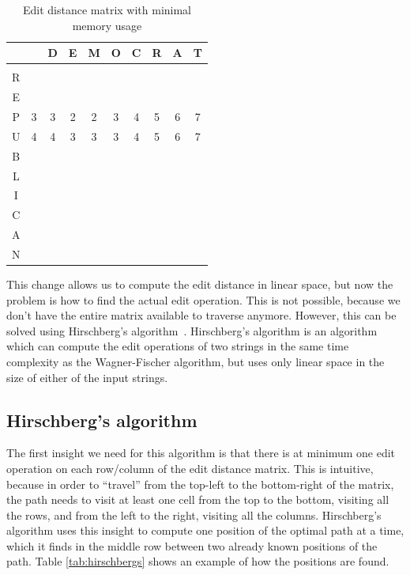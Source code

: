 \begin{table}[t]
	\begin{center}
		\begin{tabular}[c]{c|c|c|c|c|c|c|c|c|c|}
			  &   & D & E & M & O & C & R & A & T \\\hline
			  &   &   &   &   &   &   &   &   &   \\\hline
			R &   &   &   &   &   &   &   &   &   \\\hline
			E &   &   &   &   &   &   &   &   &   \\\hline
			P & 3 & 3 & 2 & 2 & 3 & 4 & 5 & 6 & 7 \\\hline
			U & 4 & 4 & 3 & 3 & 3 & 4 & 5 & 6 & 7 \\\hline
			B &   &   &   &   &   &   &   &   &   \\\hline
			L &   &   &   &   &   &   &   &   &   \\\hline
			I &   &   &   &   &   &   &   &   &   \\\hline
			C &   &   &   &   &   &   &   &   &   \\\hline
			A &   &   &   &   &   &   &   &   &   \\\hline
			N &   &   &   &   &   &   &   &   &   \\\hline
		\end{tabular}
	\end{center}
	\caption{Edit distance matrix with minimal memory usage}
	\label{tab:minimalmemoryusageeditdistance}
\end{table}

This change allows us to compute the edit distance in linear space, but now the problem is
how to find the actual edit operation. This is not possible, because we don't have the
entire matrix available to traverse anymore. However, this can be solved using
Hirschberg's algorithm~\cite{HirschbergsAlgorithm}. Hirschberg's algorithm is an algorithm
which can compute the edit operations of two strings in the same time complexity as the
Wagner-Fischer algorithm, but uses only linear space in the size of either of the input
strings.
\subsection*{Hirschberg's algorithm}

The first insight we need for this algorithm is that there is at minimum one edit
operation on each row/column of the edit distance matrix. This is intuitive, because in
order to ``travel'' from the top-left to the bottom-right of the matrix, the path needs to
visit at least one cell from the top to the bottom, visiting all the rows, and from the left
to the right, visiting all the columns. Hirschberg's algorithm uses this insight to
compute one position of the optimal path at a time, which it finds in the middle row
between two already known positions of the path. Table \ref{tab:hirschbergs} shows an
example of how the positions are found.


